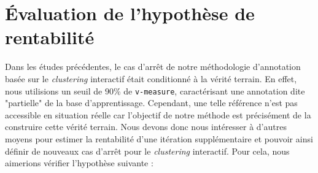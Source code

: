 \section{Évaluation de l'hypothèse de rentabilité}
\label{section:4.5-HYPOTHESE-RENTABILITE}

	Dans les études précédentes, le cas d'arrêt de notre méthodologie d'annotation basée sur le \textit{clustering} interactif était conditionné à la vérité terrain.
	En effet, nous utilisions un seuil de $90$\% de \texttt{v-measure}, caractérisant une annotation dite "partielle" de la base d'apprentissage.
	Cependant, une telle référence n'est pas accessible en situation réelle car l'objectif de notre méthode est précisément de la construire cette vérité terrain.
	Nous devons donc nous intéresser à d'autres moyens pour estimer la rentabilité d'une itération supplémentaire et pouvoir ainsi définir de nouveaux cas d'arrêt pour le \textit{clustering} interactif.
	Pour cela, nous aimerions vérifier l'hypothèse suivante :
	
